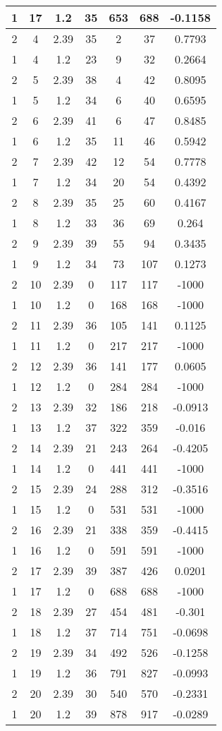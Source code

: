 \documentclass[letterpaper, 12pt]{article}
\begin{document}
\begin{longtable}{|c|c|c|c|c|c|c|}
\hline
1 & 17 & 1.2 & 35 & 653 & 688 & -0.1158 \\
\hline
2 & 4 & 2.39 & 35 & 2 & 37 & 0.7793 \\
\hline
1 & 4 & 1.2 & 23 & 9 & 32 & 0.2664 \\
\hline
2 & 5 & 2.39 & 38 & 4 & 42 & 0.8095 \\
\hline
1 & 5 & 1.2 & 34 & 6 & 40 & 0.6595 \\
\hline
2 & 6 & 2.39 & 41 & 6 & 47 & 0.8485 \\
\hline
1 & 6 & 1.2 & 35 & 11 & 46 & 0.5942 \\
\hline
2 & 7 & 2.39 & 42 & 12 & 54 & 0.7778 \\
\hline
1 & 7 & 1.2 & 34 & 20 & 54 & 0.4392 \\
\hline
2 & 8 & 2.39 & 35 & 25 & 60 & 0.4167 \\
\hline
1 & 8 & 1.2 & 33 & 36 & 69 & 0.264 \\
\hline
2 & 9 & 2.39 & 39 & 55 & 94 & 0.3435 \\
\hline
1 & 9 & 1.2 & 34 & 73 & 107 & 0.1273 \\
\hline
2 & 10 & 2.39 & 0 & 117 & 117 & -1000 \\
\hline
1 & 10 & 1.2 & 0 & 168 & 168 & -1000 \\
\hline
2 & 11 & 2.39 & 36 & 105 & 141 & 0.1125 \\
\hline
1 & 11 & 1.2 & 0 & 217 & 217 & -1000 \\
\hline
2 & 12 & 2.39 & 36 & 141 & 177 & 0.0605 \\
\hline
1 & 12 & 1.2 & 0 & 284 & 284 & -1000 \\
\hline
2 & 13 & 2.39 & 32 & 186 & 218 & -0.0913 \\
\hline
1 & 13 & 1.2 & 37 & 322 & 359 & -0.016 \\
\hline
2 & 14 & 2.39 & 21 & 243 & 264 & -0.4205 \\
\hline
1 & 14 & 1.2 & 0 & 441 & 441 & -1000 \\
\hline
2 & 15 & 2.39 & 24 & 288 & 312 & -0.3516 \\
\hline
1 & 15 & 1.2 & 0 & 531 & 531 & -1000 \\
\hline
2 & 16 & 2.39 & 21 & 338 & 359 & -0.4415 \\
\hline
1 & 16 & 1.2 & 0 & 591 & 591 & -1000 \\
\hline
2 & 17 & 2.39 & 39 & 387 & 426 & 0.0201 \\
\hline
1 & 17 & 1.2 & 0 & 688 & 688 & -1000 \\
\hline
2 & 18 & 2.39 & 27 & 454 & 481 & -0.301 \\
\hline
1 & 18 & 1.2 & 37 & 714 & 751 & -0.0698 \\
\hline
2 & 19 & 2.39 & 34 & 492 & 526 & -0.1258 \\
\hline
1 & 19 & 1.2 & 36 & 791 & 827 & -0.0993 \\
\hline
2 & 20 & 2.39 & 30 & 540 & 570 & -0.2331 \\
\hline
1 & 20 & 1.2 & 39 & 878 & 917 & -0.0289 \\
\hline
\end{longtable}
\end{document}
